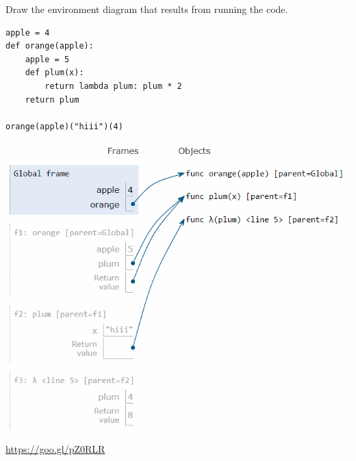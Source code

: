 \begin{blocksection}
\question Draw the environment diagram that results from running the code.

\begin{lstlisting}
apple = 4
def orange(apple):
    apple = 5
    def plum(x):
        return lambda plum: plum * 2
    return plum

orange(apple)("hiii")(4)
\end{lstlisting}

\begin{solution}[2in]
\includegraphics[scale=0.5]{apple.png}
\newline
\url{https://goo.gl/pZ0RLR}
\end{solution}
\end{blocksection}
